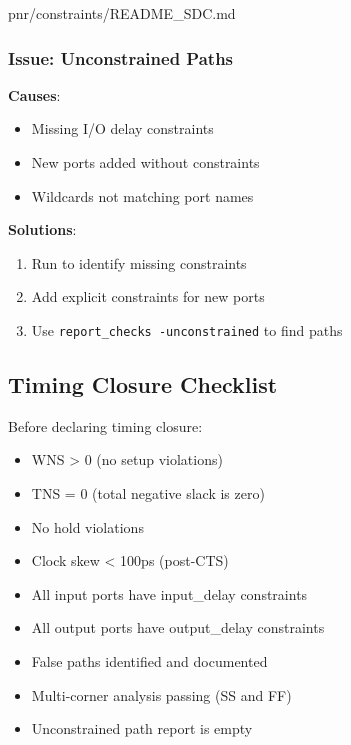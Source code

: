 \begin{relocated}{pnr/constraints/README_SDC.md}
\subsubsection{Issue: Unconstrained Paths}\label{tm:pd:constraints-readme-sdc:issue-unconstrained-paths}

\textbf{Causes}:

\begin{itemize}
\tightlist
\item
  Missing I/O delay constraints
\item
  New ports added without constraints
\item
  Wildcards not matching port names
\end{itemize}

\textbf{Solutions}:

\begin{enumerate}
\def\labelenumi{\arabic{enumi}.}
\tightlist
\item
  Run  to identify missing constraints
\item
  Add explicit constraints for new ports
\item
  Use \texttt{report\_\allowbreak{}checks\ -\allowbreak{}unconstrained}
  to find paths
\end{enumerate}

\subsection{Timing Closure Checklist}\label{tm:pd:constraints-readme-sdc:timing-closure-checklist}

Before declaring timing closure:

\begin{itemize}
\tightlist
\item[$\square$]
  WNS \textgreater{} 0 (no setup violations)
\item[$\square$]
  TNS = 0 (total negative slack is zero)
\item[$\square$]
  No hold violations
\item[$\square$]
  Clock skew \textless{} 100ps (post-CTS)
\item[$\square$]
  All input ports have input\_\allowbreak{}delay constraints
\item[$\square$]
  All output ports have output\_\allowbreak{}delay constraints
\item[$\square$]
  False paths identified and documented
\item[$\square$]
  Multi-corner analysis passing (SS and FF)
\item[$\square$]
  Unconstrained path report is empty
\end{itemize}


\end{relocated}
